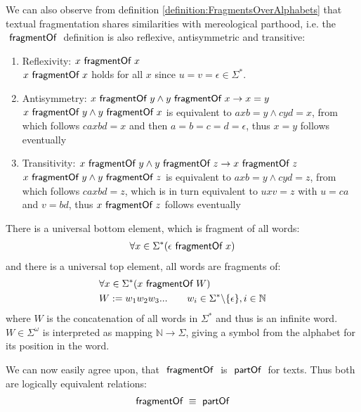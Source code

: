 We can also observe from definition \ref{definition:FragmentsOverAlphabets} that textual fragmentation shares similarities with mereological parthood, i.e. the $~\textsf{fragmentOf}~$ definition is also reflexive, antisymmetric and transitive:
\begin{enumerate}
\item
Reflexivity: $x ~\textsf{fragmentOf}~ x$\\
$x ~\textsf{fragmentOf}~ x$ holds for all $x$ since $u = v = \epsilon \in \Sigma^\ast$.
\item
Antisymmetry: $x ~\textsf{fragmentOf}~ y \wedge y ~\textsf{fragmentOf}~ x \rightarrow x = y$\\
$x ~\textsf{fragmentOf}~ y \wedge y ~\textsf{fragmentOf}~ x$ is equivalent to $axb = y \wedge cyd = x$, from which follows $caxbd = x$ and then $a=b=c=d=\epsilon$, thus $x = y$ follows eventually
\item
Transitivity: $x ~\textsf{fragmentOf}~ y \wedge y ~\textsf{fragmentOf}~ z \rightarrow x ~\textsf{fragmentOf}~ z$\\
$x ~\textsf{fragmentOf}~ y \wedge y ~\textsf{fragmentOf}~ z$ is equivalent to $axb = y \wedge cyd = z$, from which follows $caxbd = z$, which is in turn equivalent to $uxv = z$ with $u = ca$ and $v = bd$, thus $x ~\textsf{fragmentOf}~ z$ follows eventually
\end{enumerate}
There is a universal bottom element, which is fragment of all words:
\begin{align}
\forall x \in \Sigma^\ast (\epsilon ~\textsf{fragmentOf}~ x)
\end{align}
and there is a universal top element, all words are fragments of:
\begin{align}
\begin{split}
&\forall x \in \Sigma^\ast (x ~\textsf{fragmentOf}~ W)
\\
&W := w_1 w_2 w_3 ... \qquad w_i \in \Sigma^\ast \backslash \{\epsilon\}, i \in \mathbb{N}
\end{split}
\end{align}
where $W$ is the concatenation of all words in $\Sigma^\ast$ and thus is an infinite word. $W \in \Sigma^\omega$ is interpreted as mapping $\mathbb{N} \rightarrow \Sigma$, giving a symbol from the alphabet for its position in the word. 

We can now easily agree upon, that $~\textsf{fragmentOf}~$ is $~\textsf{partOf}~$ for texts.
Thus both are logically equivalent relations:
\begin{align}
~\textsf{fragmentOf}~ \equiv ~\textsf{partOf}~
\end{align}

